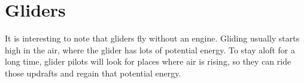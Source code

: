 \section{Gliders}

It is interesting to note that gliders fly without an engine. Gliding usually starts high in the air,  where the glider has lots of potential energy. To stay aloft for a long
time, glider pilots will look for places where air is rising, so they can ride those updrafts and regain that potential energy.

